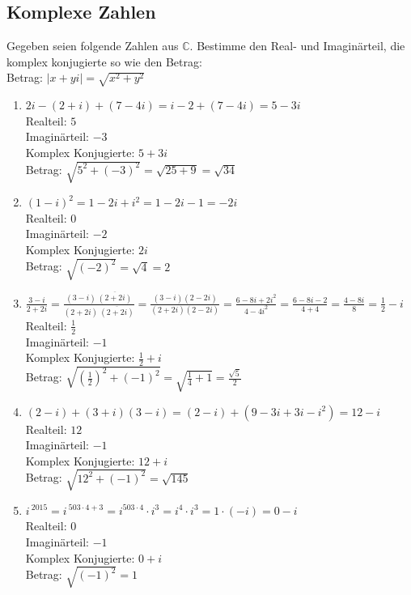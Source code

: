 \documentclass[11pt, a4paper]{article}
\newcommand{\abs}[1]{\left\lvert#1\right\rvert}
\begin{document}
\subsection{Komplexe Zahlen}
Gegeben seien folgende Zahlen aus $\mathbb{C}$. Bestimme den Real- und Imaginärteil, die komplex konjugierte so wie den Betrag: \\
Betrag: $\abs{x+yi} = \sqrt{x^2+y^2}$
\begin{enumerate}
	\item $2i - (2 + i) + (7 - 4i) = i-2 + (7-4i) = 5-3i$ \\
		Realteil: $5$ \\
		Imaginärteil: $-3$ \\
		Komplex Konjugierte: $5+3i$ \\
		Betrag: $\sqrt{5^2 + (-3)^2} = \sqrt{25+9} = \sqrt{34}$
	\item $(1-i)^2 = 1-2i+i^2 = 1-2i-1 = -2i$ \\
		Realteil: $0$ \\
		Imaginärteil: $-2$ \\
		Komplex Konjugierte: $2i$ \\
		Betrag: $\sqrt{(-2)^2} = \sqrt{4} = 2$
	\item $\frac{3-i}{2+2i} = \frac{(3-i) \ \overline{(2+2i)}}{(2+2i) \ \overline{(2+2i)}} = \frac{(3-i)(2-2i)}{(2+2i)(2-2i)} = \frac{6-8i+2i^2}{4-4i^2} = \frac{6-8i-2}{4+4} = \frac{4-8i}{8} = \frac{1}{2}-i$ \\
		Realteil: $\frac{1}{2}$ \\
		Imaginärteil: $-1$ \\
		Komplex Konjugierte: $\frac{1}{2}+i$ \\
		Betrag: $\sqrt{\left(\frac{1}{2}\right)^2+(-1)^2} = \sqrt{\frac{1}{4}+1} = \frac{\sqrt{5}}{2}$
	\item $(2-i) + (3+i)(3-i) = (2-i) + (9-3i+3i-i^2) = 12-i$ \\
		Realteil: $12$ \\
		Imaginärteil: $-1$ \\
		Komplex Konjugierte: $12+i$ \\
		Betrag: $\sqrt{12^2 + (-1)^2} = \sqrt{145}$
	\item $i^{\ 2015} = i^{\ 503 \cdot 4 + 3} = i^{503 \cdot 4} \cdot i^3 = i^4 \cdot i^3 = 1 \cdot (-i) = 0-i$ \\
		Realteil: $0$ \\
		Imaginärteil: $-1$ \\
		Komplex Konjugierte: $0+i$ \\
		Betrag: $\sqrt{(-1)^2} = 1$
\end{enumerate}
\end{document}
